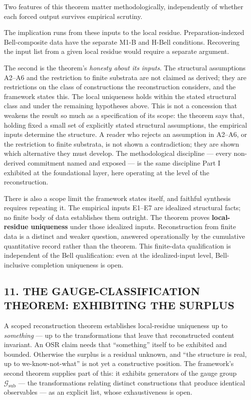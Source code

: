 \documentclass[
]{article}
\begin{document}
Two features of this theorem matter methodologically, independently of
whether each forced output survives empirical scrutiny.

The implication runs from these inputs to the local residue.
Preparation-indexed Bell-composite data have the separate M1-B and
H-Bell conditions. Recovering the input list from a given local residue
would require a separate argument.

The second is the theorem's \emph{honesty about its inputs}. The
structural assumptions A2--A6 and the restriction to finite substrata
are not claimed as derived; they are restrictions on the class of
constructions the reconstruction considers, and the framework states
this. The local uniqueness holds within the stated structural class and
under the remaining hypotheses above. This is not a concession that
weakens the result so much as a specification of its scope: the theorem
says that, holding fixed a small set of explicitly stated structural
assumptions, the empirical inputs determine the structure. A reader who
rejects an assumption in A2--A6, or the restriction to finite substrata,
is not shown a contradiction; they are shown which alternative they must
develop. The methodological discipline --- every non-derived commitment
named and exposed --- is the same discipline Part I exhibited at the
foundational layer, here operating at the level of the reconstruction.

There is also a scope limit the framework states itself, and faithful
synthesis requires repeating it. The empirical inputs E1--E7 are
idealized structural facts; no finite body of data establishes them
outright. The theorem proves \textbf{local-residue uniqueness} under
those idealized inputs. Reconstruction from finite data is a distinct
and weaker question, answered operationally by the cumulative
quantitative record rather than the theorem. This finite-data
qualification is independent of the Bell qualification: even at the
idealized-input level, Bell-inclusive completion uniqueness is open.

\hypertarget{the-gauge-classification-theorem-exhibiting-the-surplus}{%
\subsection{11. THE GAUGE-CLASSIFICATION THEOREM: EXHIBITING THE
SURPLUS}\label{the-gauge-classification-theorem-exhibiting-the-surplus}}

A scoped reconstruction theorem establishes local-residue uniqueness up
to \emph{something} --- up to the transformations that leave that
reconstructed content invariant. An OSR claim needs that ``something''
itself to be exhibited and bounded. Otherwise the surplus is a residual
unknown, and ``the structure is real, up to we-know-not-what'' is not
yet a constructive position. The framework's second theorem supplies
part of this: it exhibits generators of the gauge group
\(\mathcal{G}_{\text{sub}}\) --- the transformations relating distinct
constructions that produce identical observables --- as an explicit
list, whose exhaustiveness is open.
\end{document}
